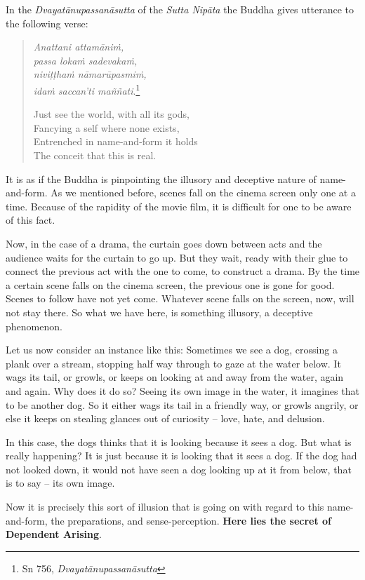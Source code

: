 In the \emph{Dvayatānupassanāsutta} of the \emph{Sutta Nipāta} the Buddha gives utterance to the following verse:

\begin{quote}
\emph{Anattani attamāniṁ,}\\
\emph{passa lokaṁ sadevakaṁ,}\\
\emph{niviṭṭhaṁ nāmarūpasmiṁ,}\\
\emph{idaṁ saccan'ti maññati}.\footnote{Sn 756, \emph{Dvayatānupassanāsutta}}

Just see the world, with all its gods,\\
Fancying a self where none exists,\\
Entrenched in name-and-form it holds\\
The conceit that this is real.
\end{quote}

It is as if the Buddha is pinpointing the illusory and deceptive nature of name-and-form. As we mentioned before, scenes fall on the cinema screen only one at a time. Because of the rapidity of the movie film, it is difficult for one to be aware of this fact.

Now, in the case of a drama, the curtain goes down between acts and the audience waits for the curtain to go up. But they wait, ready with their glue to connect the previous act with the one to come, to construct a drama. By the time a certain scene falls on the cinema screen, the previous one is gone for good. Scenes to follow have not yet come. Whatever scene falls on the screen, now, will not stay there. So what we have here, is something illusory, a deceptive phenomenon.

Let us now consider an instance like this: Sometimes we see a dog, crossing a plank over a stream, stopping half way through to gaze at the water below. It wags its tail, or growls, or keeps on looking at and away from the water, again and again. Why does it do so? Seeing its own image in the water, it imagines that to be another dog. So it either wags its tail in a friendly way, or growls angrily, or else it keeps on stealing glances out of curiosity -- love, hate, and delusion.

In this case, the dogs thinks that it is looking because it sees a dog. But what is really happening? It is just because it is looking that it sees a dog. If the dog had not looked down, it would not have seen a dog looking up at it from below, that is to say -- its own image.

Now it is precisely this sort of illusion that is going on with regard to this name-and-form, the preparations, and sense-perception. \textbf{Here lies the secret of Dependent Arising}.

